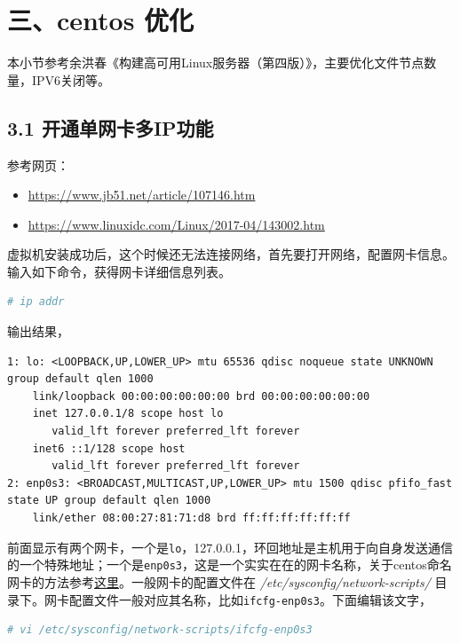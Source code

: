 \documentclass[doctor,openright,twoside]{sjtuthesis}
\providecommand{\tightlist}{%
    \setlength{\itemsep}{0pt}\setlength{\parskip}{0pt}}
\newcommand{\passthrough}[1]{#1}
\theoremstyle{plain}
\theoremstyle{definition}
\theoremstyle{remark}
\theoremstyle{ocrenumbox}
\theoremstyle{plain}
\begin{document}
\hypertarget{centos-}{%
\section{三、centos 优化}\label{centos-}}

本小节参考余洪春《构建高可用Linux服务器（第四版）》，主要优化文件节点数量，IPV6关闭等。

\hypertarget{ip}{%
\subsection{3.1 开通单网卡多IP功能}\label{ip}}

参考网页：

\begin{itemize}
\tightlist
\item
  \url{https://www.jb51.net/article/107146.htm}
\item
  \url{https://www.linuxidc.com/Linux/2017-04/143002.htm}
\end{itemize}

虚拟机安装成功后，这个时候还无法连接网络，首先要打开网络，配置网卡信息。输入如下命令，获得网卡详细信息列表。

\begin{lstlisting}[language=bash]
# ip addr
\end{lstlisting}

输出结果，

\begin{lstlisting}
1: lo: <LOOPBACK,UP,LOWER_UP> mtu 65536 qdisc noqueue state UNKNOWN group default qlen 1000
    link/loopback 00:00:00:00:00:00 brd 00:00:00:00:00:00
    inet 127.0.0.1/8 scope host lo
       valid_lft forever preferred_lft forever
    inet6 ::1/128 scope host 
       valid_lft forever preferred_lft forever
2: enp0s3: <BROADCAST,MULTICAST,UP,LOWER_UP> mtu 1500 qdisc pfifo_fast state UP group default qlen 1000
    link/ether 08:00:27:81:71:d8 brd ff:ff:ff:ff:ff:ff
\end{lstlisting}

前面显示有两个网卡，一个是\passthrough{\lstinline!lo!}，127.0.0.1，环回地址是主机用于向自身发送通信的一个特殊地址；一个是\passthrough{\lstinline!enp0s3!}，这是一个实实在在的网卡名称，关于centos命名网卡的方法参考\href{https://www.jianshu.com/p/1bd6461b930c}{这里}。一般网卡的配置文件在 \emph{/etc/sysconfig/network-scripts/} 目录下。网卡配置文件一般对应其名称，比如\passthrough{\lstinline!ifcfg-enp0s3!}。下面编辑该文字，

\begin{lstlisting}[language=bash]
# vi /etc/sysconfig/network-scripts/ifcfg-enp0s3
\end{lstlisting}
\end{document}
